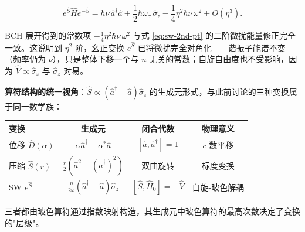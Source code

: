 \begin{formulabox}[SW 变换结果]
\begin{equation}
\boxed{e^{\hat{S}}\hat{H}e^{-\hat{S}} = \hbar\nu\,\hat{a}^\dagger\hat{a} + \frac12\hbar\omega_\sigma\,\hat{\sigma}_z - \frac14\eta^2\hbar\nu\,\omega^2 + O(\eta^3).}
\end{equation}
\end{formulabox}

\begin{insightbox}[与微扰论的自洽性及算符结构的统一性]
BCH 展开得到的常数项 $-\frac14\eta^2\hbar\nu\,\omega^2$ 与式 \eqref{eq:sw-2nd-pt} 的二阶微扰能量修正完全一致。这说明到 $\eta^2$ 阶，幺正变换 $e^{\hat{S}}$ 已将微扰完全对角化——谐振子能谱不变（频率仍为 $\nu$），只是整体下移一个与 $n$ 无关的常数；自旋自由度也不受影响，因为 $\hat{V}\propto\hat{\sigma}_z$ 与 $\hat{\sigma}_z$ 对易。

\textbf{算符结构的统一视角}：$\hat{S}\propto(\hat{a}^\dagger-\hat{a})\hat{\sigma}_z$ 的生成元形式，与此前讨论的三种变换属于同一数学族：
\begin{center}
\renewcommand{\arraystretch}{1.3}
\begin{tabular}{lccc}
\toprule
\textbf{变换} & \textbf{生成元} & \textbf{闭合代数} & \textbf{物理意义} \\
\midrule
位移 $\hat{D}(\alpha)$ & $\alpha\hat{a}^\dagger-\alpha^*\hat{a}$ & $[\hat{a},\hat{a}^\dagger]=1$ & $c$ 数平移 \\
压缩 $\hat{S}(r)$ & $\frac{r}{2}(\hat{a}^2-(\hat{a}^\dagger)^2)$ & 双曲旋转 & 标度变换 \\
SW $e^{\hat{S}}$ & $\frac{\eta}{2\omega}(\hat{a}^\dagger-\hat{a})\hat{\sigma}_z$ & $[\hat{S},\hat{H}_0]=-\hat{V}$ & 自旋-玻色解耦 \\
\bottomrule
\end{tabular}
\end{center}
三者都由玻色算符通过指数映射构造，其生成元中玻色算符的最高次数决定了变换的"层级"。
\end{insightbox}

